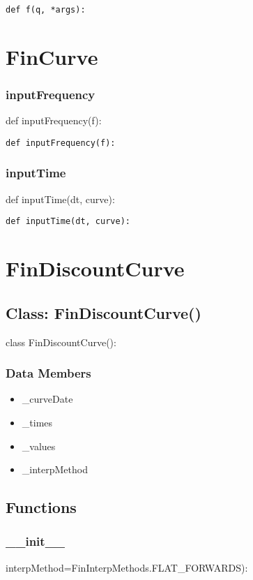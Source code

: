 \documentclass[twoside,11pt]{book}
\begin{document}
\begin{lstlisting}
def f(q, *args):
\end{lstlisting}

\newpage
\section{FinCurve}

\subsubsection*{{\bf inputFrequency}}
def inputFrequency(f): 

\begin{lstlisting}
def inputFrequency(f):
\end{lstlisting}

\subsubsection*{{\bf inputTime}}
def inputTime(dt, curve): 

\begin{lstlisting}
def inputTime(dt, curve):
\end{lstlisting}

\newpage
\section{FinDiscountCurve}

\subsection*{Class: FinDiscountCurve()}
class FinDiscountCurve(): 

\subsubsection*{Data Members}
\begin{itemize}
\item{\_curveDate}
\item{\_times}
\item{\_values}
\item{\_interpMethod}
\end{itemize}

\subsection*{Functions}

\subsubsection*{{\bf \_\_init\_\_}}
interpMethod=FinInterpMethods.FLAT\_FORWARDS): 
\end{document}
